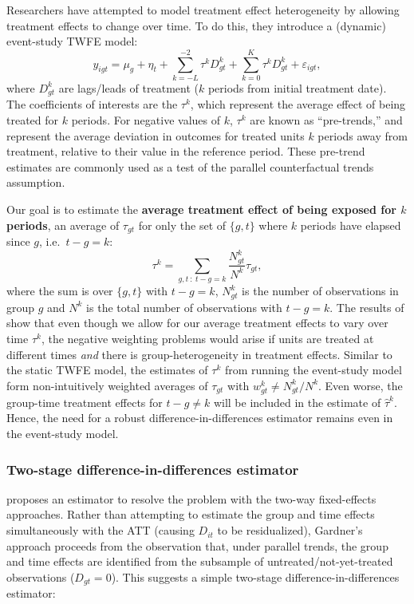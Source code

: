 Researchers have attempted to model treatment effect heterogeneity by
allowing treatment effects to change over time. To do this, they
introduce a (dynamic) event-study TWFE model: \begin{equation}
  y_{igt} = \mu_g + \eta_t + \sum_{k = -L}^{-2} \tau^k D_{gt}^k + \sum_{k = 0}^{K} \tau^k D_{gt}^k + \varepsilon_{igt},
\end{equation} where \(D_{gt}^k\) are lags/leads of treatment (\(k\)
periods from initial treatment date). The coefficients of interests are
the \(\tau^k\), which represent the average effect of being treated for
\(k\) periods. For negative values of \(k\), \(\tau^k\) are known as
``pre-trends,'' and represent the average deviation in outcomes for
treated units \(k\) periods away from treatment, relative to their value
in the reference period. These pre-trend estimates are commonly used as
a test of the parallel counterfactual trends assumption.

Our goal is to estimate the \textbf{average treatment effect of being
exposed for \(k\) periods}, an average of \(\tau_{gt}\) for only the set
of \(\{g,t\}\) where \(k\) periods have elapsed since \(g\),
i.e.~\(t - g = k\): \[
  \tau^k = \sum_{g,t \ : \ t - g = k} \frac{N_{gt}^k}{N^k} \tau_{gt},
\] where the sum is over \(\{g,t\}\) with \(t - g = k\), \(N_{gt}^k\) is
the number of observations in group \(g\) and \(N^k\) is the total
number of observations with \(t - g = k\). The results of
\citet{Sun_Abraham_2020} show that even though we allow for our average
treatment effects to vary over time \(\tau^k\), the negative weighting
problems would arise if units are treated at different times \emph{and}
there is group-heterogeneity in treatment effects. Similar to the static
TWFE model, the estimates of \(\tau^k\) from running the event-study
model form non-intuitively weighted averages of \(\tau_{gt}\) with
\(w_{gt}^k \neq N_{gt}^k/N^k\). Even worse, the group-time treatment
effects for \(t-g \neq k\) will be included in the estimate of
\(\hat{\tau}^k\). Hence, the need for a robust difference-in-differences
estimator remains even in the event-study model.

\hypertarget{two-stage-difference-in-differences-estimator}{%
\subsubsection{Two-stage difference-in-differences
estimator}\label{two-stage-difference-in-differences-estimator}}

\citet{Gardner_2021} proposes an estimator to resolve the problem with
the two-way fixed-effects approaches. Rather than attempting to estimate
the group and time effects simultaneously with the ATT (causing
\(D_{it}\) to be residualized), Gardner's approach proceeds from the
observation that, under parallel trends, the group and time effects are
identified from the subsample of untreated/not-yet-treated observations
(\(D_{gt} = 0\)). This suggests a simple two-stage
difference-in-differences estimator:

